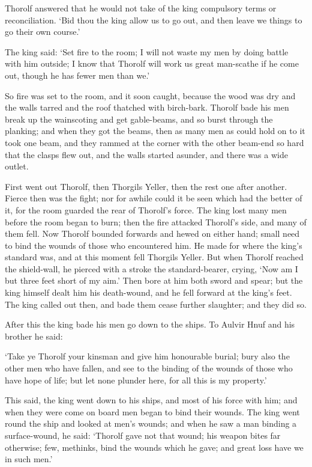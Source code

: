 Thorolf answered that he would not take of the king compulsory terms or reconciliation. `Bid thou the king allow us to go out, and then leave we things to go their own course.'

The king said: `Set fire to the room; I will not waste my men by doing battle with him outside; I know that Thorolf will work us great man-scathe if he come out, though he has fewer men than we.'

So fire was set to the room, and it soon caught, because the wood was dry and the walls tarred and the roof thatched with birch-bark. Thorolf bade his men break up the wainscoting and get gable-beams, and so burst through the planking; and when they got the beams, then as many men as could hold on to it took one beam, and they rammed at the corner with the other beam-end so hard that the clasps flew out, and the walls started asunder, and there was a wide outlet.

First went out Thorolf, then Thorgils Yeller, then the rest one after another. Fierce then was the fight; nor for awhile could it be seen which had the better of it, for the room guarded the rear of Thorolf's force. The king lost many men before the room began to burn; then the fire attacked Thorolf's side, and many of them fell. Now Thorolf bounded forwards and hewed on either hand; small need to bind the wounds of those who encountered him. He made for where the king's standard was, and at this moment fell Thorgils Yeller. But when Thorolf reached the shield-wall, he pierced with a stroke the standard-bearer, crying, `Now am I but three feet short of my aim.' Then bore at him both sword and spear; but the king himself dealt him his death-wound, and he fell forward at the king's feet. The king called out then, and bade them cease further slaughter; and they did so.

After this the king bade his men go down to the ships. To Aulvir Hnuf and his brother he said:

`Take ye Thorolf your kinsman and give him honourable burial; bury also the other men who have fallen, and see to the binding of the wounds of those who have hope of life; but let none plunder here, for all this is my property.'

This said, the king went down to his ships, and most of his force with him; and when they were come on board men began to bind their wounds. The king went round the ship and looked at men's wounds; and when he saw a man binding a surface-wound, he said: `Thorolf gave not that wound; his weapon bites far otherwise; few, methinks, bind the wounds which he gave; and great loss have we in such men.'

